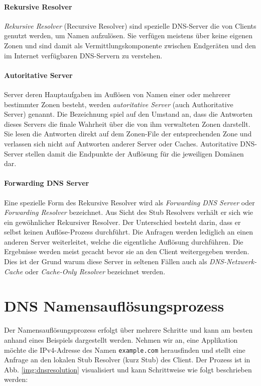 \paragraph{Rekursive Resolver}
\textit{Rekursive Resolver} (Recursive Resolver) sind spezielle DNS-Server die von Clients genutzt werden, um Namen aufzulösen. Sie verfügen meistens über keine eigenen Zonen und sind damit als Vermittlungskomponente zwischen Endgeräten und den im Internet verfügbaren DNS-Servern zu verstehen.

\paragraph{Autoritative Server}
Server deren Hauptaufgaben im Auflösen von Namen einer oder mehrerer bestimmter Zonen besteht, werden \textit{autoritative Server} (auch Authoritative Server) genannt. Die Bezeichnung spiel auf den Umstand an, dass die Antworten dieses Servers die finale Wahrheit über die von ihm verwalteten Zonen darstellt. Sie lesen die Antworten direkt auf dem Zonen-File der entsprechenden Zone und verlassen sich nicht auf Antworten anderer Server oder Caches. Autoritative DNS-Server stellen damit die Endpunkte der Auflösung für die jeweiligen Domänen dar.

\paragraph{Forwarding DNS Server}
Eine spezielle Form des Rekursive Resolver wird als \textit{Forwarding DNS Server} oder \textit{Forwarding Resolver} bezeichnet. Aus Sicht des Stub Resolvers verhält er sich wie ein gewöhnlicher Rekursiver Resolver. Der Unterschied besteht darin, dass er selbst keinen Auflöse-Prozess durchführt. Die Anfragen werden lediglich an einen anderen Server weiterleitet, welche die eigentliche Auflösung durchführen. Die Ergebnisse werden meist gecacht bevor sie an den Client weitergegeben werden. Dies ist der Grund warum diese Server in seltenen Fällen auch als \textit{DNS-Netzwerk-Cache} oder \textit{Cache-Only Resolver} bezeichnet werden. 

\section{DNS Namensauflösungsprozess}
\label{sec:dnsresolution}
Der Namensauflösungsprozess erfolgt über mehrere Schritte und kann am besten anhand eines Beispiels dargestellt werden. Nehmen wir an, eine Applikation möchte die IPv4-Adresse des Namen \texttt{example.com} herausfinden und stellt eine Anfrage an den lokalen Stub Resolver (kurz Stub) des Client. Der Prozess ist in Abb. \ref{img:dnsresolution} visualisiert und kann Schrittweise wie folgt beschrieben werden:

